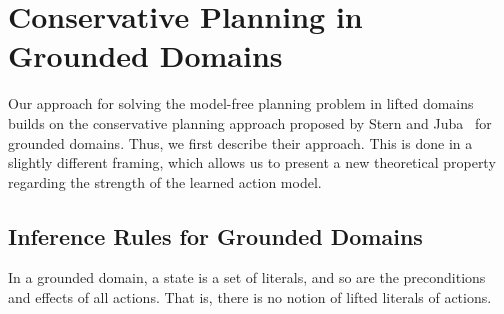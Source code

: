 \documentclass{article}
\newcommand{\tuple}[1]{\ensuremath{\left \langle #1 \right \rangle }}
\newcommand{\liftf}{F}
\newcommand{\lifta}{A}
\begin{document}










\section{Conservative Planning in Grounded Domains}

Our approach for solving the model-free planning problem in lifted domains builds on the {conservative planning} approach proposed by Stern and Juba~ for grounded domains. 
Thus, we first describe their approach. 
This is done in a slightly different framing, which allows us to present a new theoretical property regarding the strength of the learned action model.  


\subsection{Inference Rules for Grounded Domains}
In a grounded domain, 
a state is a set of literals, 
and so are the preconditions and effects of all actions. 
That is, there is no notion of lifted literals of actions.
\end{document}
